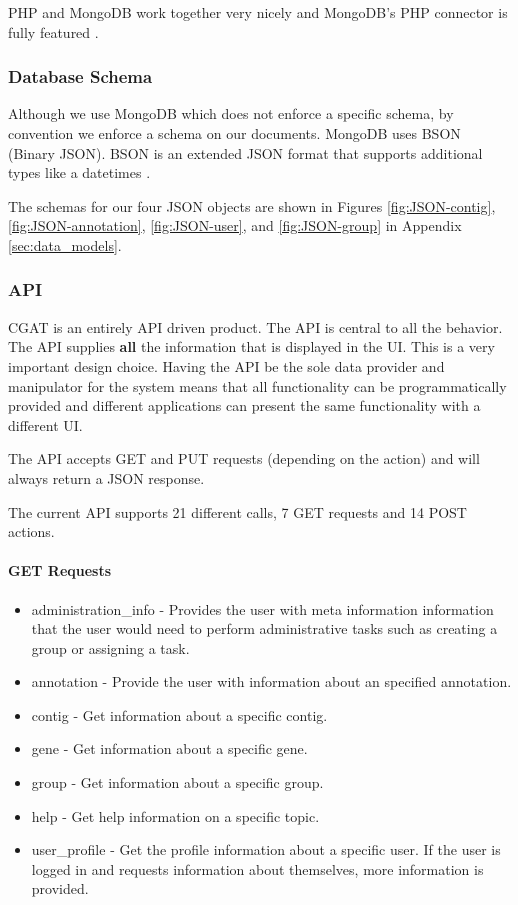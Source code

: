 \documentclass[10pt, conference, compsocconf]{IEEEtran}
\begin{document}
PHP and MongoDB work together very nicely and MongoDB's PHP connector is fully featured \cite{phpMongo}.

\subsubsection{Database Schema}
Although we use MongoDB which does not enforce a specific schema, by convention we enforce a schema on our documents.
MongoDB uses BSON (Binary JSON). BSON is an extended JSON format that supports additional types like a datetimes \cite{bson}.

The schemas for our four JSON objects are shown in Figures \ref{fig:JSON-contig}, \ref{fig:JSON-annotation},
\ref{fig:JSON-user}, and \ref{fig:JSON-group} in Appendix \ref{sec:data_models}.

\subsubsection{API}
CGAT is an entirely API driven product. The API is central to all the behavior.
The API supplies \textbf{all} the information that is displayed in the UI.
This is a very important design choice. Having the API be the sole data provider and manipulator for the system
means that all functionality can be programmatically provided and different applications can present the same
functionality with a different UI.

The API accepts GET and PUT requests (depending on the action) and will always return a JSON response.

The current API supports 21 different calls, 7 GET requests and 14 POST actions.

\paragraph{GET Requests}
\begin{itemize}
\item administration\_info - Provides the user with meta information information that the user would need to perform administrative tasks such as creating a group or assigning a task.
\item annotation - Provide the user with information about an specified annotation.
\item contig - Get information about a specific contig.
\item gene - Get information about a specific gene.
\item group - Get information about a specific group.
\item help - Get help information on a specific topic.
\item user\_profile - Get the profile information about a specific user. If the user is logged in and requests information about themselves, more information is provided.
\end{itemize}
\end{document}
